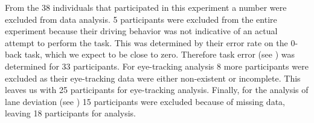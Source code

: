 From the 38 individuals that participated in this experiment a number were excluded from data analysis.
5 participants were excluded from the entire experiment because their driving behavior was not indicative of an actual attempt to perform the task.
This was determined by their error rate on the 0-back task, which we expect to be close to zero.
Therefore task error (see \citet{DeMooij2021}) was determined for 33 participants.
For eye-tracking analysis 8 more participants were excluded as their eye-tracking data were either non-existent or incomplete.
This leaves us with 25 participants for eye-tracking analysis.
Finally, for the analysis of lane deviation (see \citet{Kelapanda2021}) 15 participants were excluded because of missing data, leaving 18 participants for analysis.